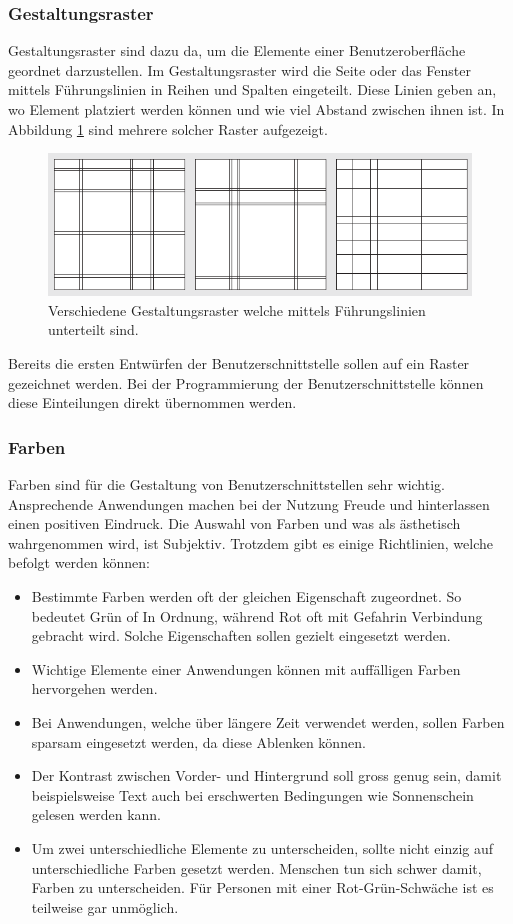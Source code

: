 \subsubsection{Gestaltungsraster}
Gestaltungsraster sind dazu da, um die Elemente einer Benutzeroberfläche geordnet darzustellen.
Im Gestaltungsraster wird die Seite oder das Fenster mittels Führungslinien in Reihen und Spalten eingeteilt.
Diese Linien geben an, wo Element platziert werden können und wie viel Abstand zwischen ihnen ist.
In Abbildung \ref{fig:Gestaltungsraster} sind mehrere solcher Raster aufgezeigt.
\begin{figure}[H]
   \centering
   \includegraphics[width=1.0\textwidth]{gfx/Gestaltungsraster_aus_buch.png}
   \caption{
      Verschiedene Gestaltungsraster welche mittels Führungslinien unterteilt sind.
   }
   \label{fig:Gestaltungsraster}
\end{figure}
Bereits die ersten Entwürfen der Benutzerschnittstelle sollen auf ein Raster gezeichnet werden.
Bei der Programmierung der Benutzerschnittstelle können diese Einteilungen direkt übernommen werden.


\subsubsection{Farben}
Farben sind für die Gestaltung von Benutzerschnittstellen sehr wichtig.
Ansprechende Anwendungen machen bei der Nutzung Freude und hinterlassen einen positiven Eindruck.
Die Auswahl von Farben und was als ästhetisch wahrgenommen wird, ist Subjektiv.
Trotzdem gibt es einige Richtlinien, welche befolgt werden können:
\begin{itemize}
   \item Bestimmte Farben werden oft der gleichen Eigenschaft zugeordnet. So bedeutet Grün of \dq In Ordnung\dq, während Rot oft mit \dq Gefahr\dq in Verbindung gebracht wird. Solche Eigenschaften sollen gezielt eingesetzt werden.
   \item Wichtige Elemente einer Anwendungen können mit auffälligen Farben hervorgehen werden.
   \item Bei Anwendungen, welche über längere Zeit verwendet werden, sollen Farben sparsam eingesetzt werden, da diese Ablenken können.
   \item Der Kontrast zwischen Vorder- und Hintergrund soll gross genug sein, damit beispielsweise Text auch bei erschwerten Bedingungen wie Sonnenschein gelesen werden kann.
   \item Um zwei unterschiedliche Elemente zu unterscheiden, sollte nicht einzig auf unterschiedliche Farben gesetzt werden. Menschen tun sich schwer damit, Farben zu unterscheiden.
Für Personen mit einer Rot-Grün-Schwäche ist es teilweise gar unmöglich.
\end{itemize}


